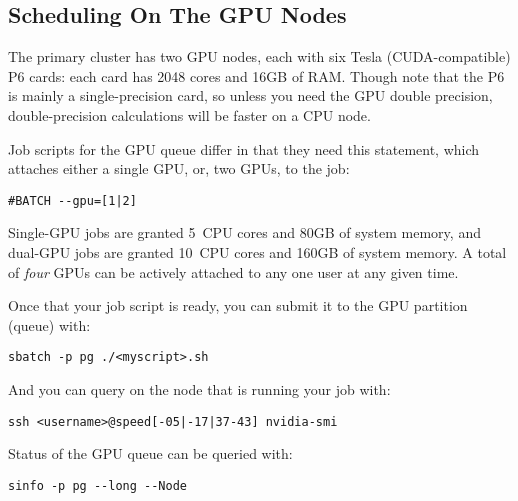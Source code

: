 
\subsection{Scheduling On The GPU Nodes}

The primary cluster has two GPU nodes, each with six Tesla (CUDA-compatible) P6
cards: each card has 2048 cores and 16GB of RAM. Though note that the P6
is mainly a single-precision card, so unless you need the GPU double
precision, double-precision calculations will be faster on a CPU node.

Job scripts for the GPU queue differ in that they
%
%
need this statement, which attaches either a single GPU, or, two
GPUs, to the job:

\begin{verbatim}
#BATCH --gpu=[1|2]
\end{verbatim}

Single-GPU jobs are granted 5~CPU cores and 80GB of system memory, and
dual-GPU jobs are granted 10~CPU cores and 160GB of system memory. A
total of \emph{four} GPUs can be actively attached to any one user at any given
time.

Once that your job script is ready, you can submit it to the GPU partition (queue)
with:

\begin{verbatim}
sbatch -p pg ./<myscript>.sh
\end{verbatim}

And you can query  on the node that is running your job with:

\begin{verbatim}
ssh <username>@speed[-05|-17|37-43] nvidia-smi
\end{verbatim}

Status of the GPU queue can be queried with:

\begin{verbatim}
sinfo -p pg --long --Node
\end{verbatim}

